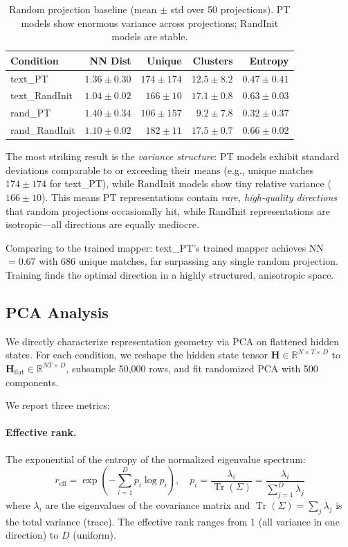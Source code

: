 \documentclass[11pt,a4paper]{article}
\newcommand{\R}{\mathbb{R}}
\DeclareMathOperator{\Tr}{Tr}
\begin{document}
\begin{table}[H]
\centering
\begin{tabular}{lrrrr}
\toprule
Condition & NN Dist & Unique & Clusters & Entropy \\
\midrule
text\_PT & $1.36 \pm 0.30$ & $174 \pm 174$ & $12.5 \pm 8.2$ & $0.47 \pm 0.41$ \\
text\_RandInit & $1.04 \pm 0.02$ & $166 \pm 10$ & $17.1 \pm 0.8$ & $0.63 \pm 0.03$ \\
rand\_PT & $1.40 \pm 0.34$ & $106 \pm 157$ & $9.2 \pm 7.8$ & $0.32 \pm 0.37$ \\
rand\_RandInit & $1.10 \pm 0.02$ & $182 \pm 11$ & $17.5 \pm 0.7$ & $0.66 \pm 0.02$ \\
\bottomrule
\end{tabular}
\caption{Random projection baseline (mean $\pm$ std over 50 projections). PT models show enormous variance across projections; RandInit models are stable.}
\label{tab:random-proj}
\end{table}

The most striking result is the \emph{variance structure}: PT models exhibit standard deviations comparable to or exceeding their means (e.g., unique matches $174 \pm 174$ for text\_PT), while RandInit models show tiny relative variance ($166 \pm 10$).
This means PT representations contain \emph{rare, high-quality directions} that random projections occasionally hit, while RandInit representations are isotropic---all directions are equally mediocre.

Comparing to the trained mapper: text\_PT's trained mapper achieves NN $= 0.67$ with 686 unique matches, far surpassing any single random projection.
Training finds the optimal direction in a highly structured, anisotropic space.

\subsection{PCA Analysis}

We directly characterize representation geometry via PCA on flattened hidden states.
For each condition, we reshape the hidden state tensor $\mathbf{H} \in \R^{N \times T \times D}$ to $\mathbf{H}_{\text{flat}} \in \R^{NT \times D}$, subsample 50{,}000 rows, and fit randomized PCA with 500 components.

We report three metrics:

\paragraph{Effective rank.}
The exponential of the entropy of the normalized eigenvalue spectrum:
\begin{equation}
    r_{\text{eff}} = \exp\!\left(-\sum_{i=1}^{D} p_i \log p_i\right), \quad p_i = \frac{\lambda_i}{\Tr(\Sigma)} = \frac{\lambda_i}{\sum_{j=1}^D \lambda_j}
\end{equation}
where $\lambda_i$ are the eigenvalues of the covariance matrix and $\Tr(\Sigma) = \sum_j \lambda_j$ is the total variance (trace).
The effective rank ranges from 1 (all variance in one direction) to $D$ (uniform).
\end{document}
